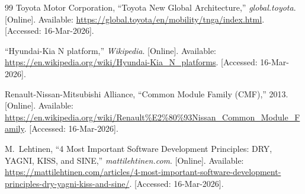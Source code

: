 \documentclass[conference]{IEEEtran}
\begin{document}
\begin{thebibliography}{99}
Toyota Motor Corporation, ``Toyota New Global Architecture,''
\textit{global.toyota}. [Online]. Available:
\url{https://global.toyota/en/mobility/tnga/index.html}.
[Accessed: 16-Mar-2026].

``Hyundai-Kia N platform,'' \textit{Wikipedia}. [Online].
Available:
\url{https://en.wikipedia.org/wiki/Hyundai-Kia_N_platforms}.
[Accessed: 16-Mar-2026].

Renault-Nissan-Mitsubishi Alliance, ``Common Module Family
(CMF),'' 2013. [Online]. Available:
\url{https://en.wikipedia.org/wiki/Renault\%E2\%80\%93Nissan_Common_Module_Family}.
[Accessed: 16-Mar-2026].

M.~Lehtinen, ``4 Most Important Software Development Principles:
DRY, YAGNI, KISS, and SINE,'' \textit{mattilehtinen.com}.
[Online]. Available:
\url{https://mattilehtinen.com/articles/4-most-important-software-development-principles-dry-yagni-kiss-and-sine/}.
[Accessed: 16-Mar-2026].

\end{thebibliography}
\end{document}
